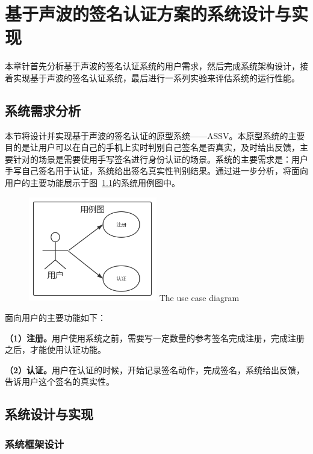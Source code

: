 \chapter{基于声波的签名认证方案的系统设计与实现}

本章针首先分析基于声波的签名认证系统的用户需求，然后完成系统架构设计，接着实现基于声波的签名认证系统，最后进行一系列实验来评估系统的运行性能。

\section{系统需求分析}

本节将设计并实现基于声波的签名认证的原型系统——ASSV。本原型系统的主要目的是让用户可以在自己的手机上实时判别自己签名是否真实，及时给出反馈，主要针对的场景是需要使用手写签名进行身份认证的场景。系统的主要需求是：用户手写自己签名用于认证，系统给出签名真实性判别结果。通过进一步分析，将面向用户的主要功能展示于图~\ref{fig:use-case}的系统用例图中。
\begin{figure}[!htp]
  \centering
  \includegraphics[width=0.5\textwidth]{figure/use-case.png}
      {The use case diagram}
  \label{fig:use-case}
\end{figure}

面向用户的主要功能如下：

\textbf{（1）注册。}用户使用系统之前，需要写一定数量的参考签名完成注册，完成注册之后，才能使用认证功能。

\textbf{（2）认证。}用户在认证的时候，开始记录签名动作，完成签名，系统给出反馈，告诉用户这个签名的真实性。


\section{系统设计与实现}
\subsection{系统框架设计}

